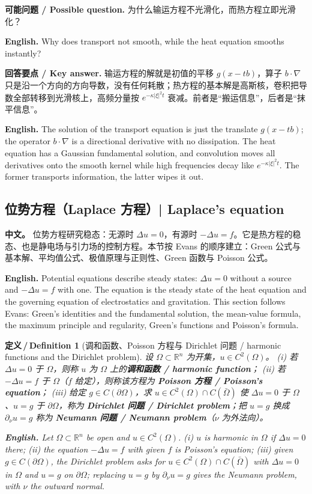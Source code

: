 \documentclass[UTF8,11pt,a4paper]{ctexart}
\newcommand{\APS}[2]{\par\noindent\textbf{中文。} #1\par\noindent\textbf{English.} #2\par\smallskip}
\newcommand{\EN}[1]{\par\noindent \textbf{English.} #1\par}
\newcommand{\ASK}[4]{\par\noindent \textbf{可能问题 / Possible question.} #1\par\EN{#2}\noindent \textbf{回答要点 / Key answer.} #3\par\EN{#4}\medskip}
\newtheorem{definition}{定义\,/\,Definition}[section]
\newcommand{\R}{\mathbb{R}}
\begin{document}
\ASK{为什么输运方程不光滑化，而热方程立即光滑化？}{Why does transport not smooth, while the heat equation smooths instantly?}{输运方程的解就是初值的平移 $g(x-tb)$，算子 $b\cdot\nabla$ 只是沿一个方向的方向导数，没有任何耗散；热方程的基本解是高斯核，卷积把导数全部转移到光滑核上，高频分量按 $e^{-\kappa|\xi|^2t}$ 衰减。前者是``搬运信息''，后者是``抹平信息''。}{The solution of the transport equation is just the translate $g(x-tb)$; the operator $b\cdot\nabla$ is a directional derivative with no dissipation. The heat equation has a Gaussian fundamental solution, and convolution moves all derivatives onto the smooth kernel while high frequencies decay like $e^{-\kappa|\xi|^2t}$. The former transports information, the latter wipes it out.}

\subsection{位势方程（Laplace 方程）| Laplace's equation}
\APS{位势方程研究稳态：无源时 $\Delta u=0$，有源时 $-\Delta u=f$。它是热方程的稳态、也是静电场与引力场的控制方程。本节按 Evans 的顺序建立：Green 公式与基本解、平均值公式、极值原理与正则性、Green 函数与 Poisson 公式。}{Potential equations describe steady states: $\Delta u=0$ without a source and $-\Delta u=f$ with one. The equation is the steady state of the heat equation and the governing equation of electrostatics and gravitation. This section follows Evans: Green's identities and the fundamental solution, the mean-value formula, the maximum principle and regularity, Green's functions and Poisson's formula.}

\begin{definition}[调和函数、Poisson 方程与 Dirichlet 问题 / harmonic functions and the Dirichlet problem]\label{def:harmonic}
设 $\Omega\subset\R^n$ 为开集，$u\in C^2(\Omega)$。
(i) 若 $\Delta u=0$ 于 $\Omega$，则称 $u$ 为 $\Omega$ 上的\textbf{调和函数 / harmonic function}；
(ii) 若 $-\Delta u=f$ 于 $\Omega$（$f$ 给定），则称该方程为 \textbf{Poisson 方程 / Poisson's equation}；
(iii) 给定 $g\in C(\partial\Omega)$，求 $u\in C^2(\Omega)\cap C(\bar\Omega)$ 使 $\Delta u=0$ 于 $\Omega$、$u=g$ 于 $\partial\Omega$，称为 \textbf{Dirichlet 问题 / Dirichlet problem}；把 $u=g$ 换成 $\partial_\nu u=g$ 称为 \textbf{Neumann 问题 / Neumann problem}（$\nu$ 为外法向）。
\EN{Let $\Omega\subset\R^n$ be open and $u\in C^2(\Omega)$. (i) $u$ is harmonic in $\Omega$ if $\Delta u=0$ there; (ii) the equation $-\Delta u=f$ with given $f$ is Poisson's equation; (iii) given $g\in C(\partial\Omega)$, the Dirichlet problem asks for $u\in C^2(\Omega)\cap C(\bar\Omega)$ with $\Delta u=0$ in $\Omega$ and $u=g$ on $\partial\Omega$; replacing $u=g$ by $\partial_\nu u=g$ gives the Neumann problem, with $\nu$ the outward normal.}
\end{definition}
\end{document}
